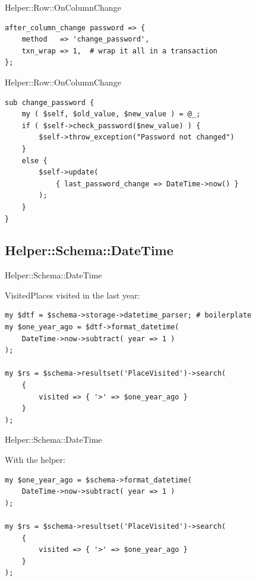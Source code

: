 \begin{frame}[fragile]{Helper::Row::OnColumnChange}
\begin{lstlisting}
after_column_change password => {
    method   => 'change_password',
    txn_wrap => 1,  # wrap it all in a transaction
};
\end{lstlisting}
\end{frame}

\begin{frame}[fragile]{Helper::Row::OnColumnChange}
\begin{lstlisting}
sub change_password {
    my ( $self, $old_value, $new_value ) = @_;
    if ( $self->check_password($new_value) ) {
        $self->throw_exception("Password not changed")
    }
    else {
        $self->update(
            { last_password_change => DateTime->now() }
        );
    }
}
\end{lstlisting}
\end{frame}

\subsection{Helper::Schema::DateTime}

\begin{frame}[fragile]{Helper::Schema::DateTime}

VisitedPlaces visited in the last year:

\begin{lstlisting}
my $dtf = $schema->storage->datetime_parser; # boilerplate
my $one_year_ago = $dtf->format_datetime(
    DateTime->now->subtract( year => 1 )
);

my $rs = $schema->resultset('PlaceVisited')->search(
    {
        visited => { '>' => $one_year_ago }
    }
);
\end{lstlisting}
\end{frame}

\begin{frame}[fragile]{Helper::Schema::DateTime}

With the helper:

\begin{lstlisting}
my $one_year_ago = $schema->format_datetime(
    DateTime->now->subtract( year => 1 )
);

my $rs = $schema->resultset('PlaceVisited')->search(
    {
        visited => { '>' => $one_year_ago }
    }
);
\end{lstlisting}
\end{frame}

